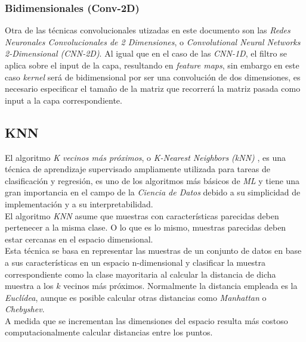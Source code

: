                 
            \subsubsection {Bidimensionales (Conv-2D)}
                Otra de las técnicas convolucionales utizadas en este documento son las \textit{Redes Neuronales Convolucionales de 2 Dimensiones}, o \textit{Convolutional Neural Networks 2-Dimensional (CNN-2D)}. Al igual que en el caso de las \textit{CNN-1D}, el filtro se aplica sobre el input de la capa, resultando en \textit{feature maps}, sin embargo en este caso \textit{kernel} será de bidimensional por ser una convolución de dos dimensiones, es necesario especificar el tamaño de la matriz que recorrerá la matriz pasada como input a la capa correspondiente.

                \textit{}

        \subsection {KNN}

            El algoritmo \textit{K vecinos más próximos}, o \textit{K-Nearest Neighbors (kNN)} \cite{KNN}, es una técnica de aprendizaje supervisado ampliamente utilizada para tareas de clasificación y regresión, es uno de los algoritmos más básicos de \textit{ML} y tiene una gran importancia en el campo de la \textit{Ciencia de Datos} debido a su simplicidad de implementación y a su interpretabilidad.\\

            El algoritmo \textit{KNN} asume que muestras con características parecidas deben pertenecer a la misma clase. O lo que es lo mismo, muestras parecidas deben estar cercanas en el espacio dimensional.\\

            Esta técnica se basa en representar las muestras de un conjunto de datos en base a sus características en un espacio n-dimensional y clasificar la muestra correspondiente como la clase mayoritaria al calcular la distancia de dicha muestra a los $k$ vecinos más próximos. Normalmente la distancia empleada es la \textit{Euclídea}, aunque es posible calcular otras distancias como \textit{Manhattan} o \textit{Chebyshev}.\\
            
            A medida que se incrementan las dimensiones del espacio resulta más costoso computacionalmente calcular distancias entre los puntos.\\


